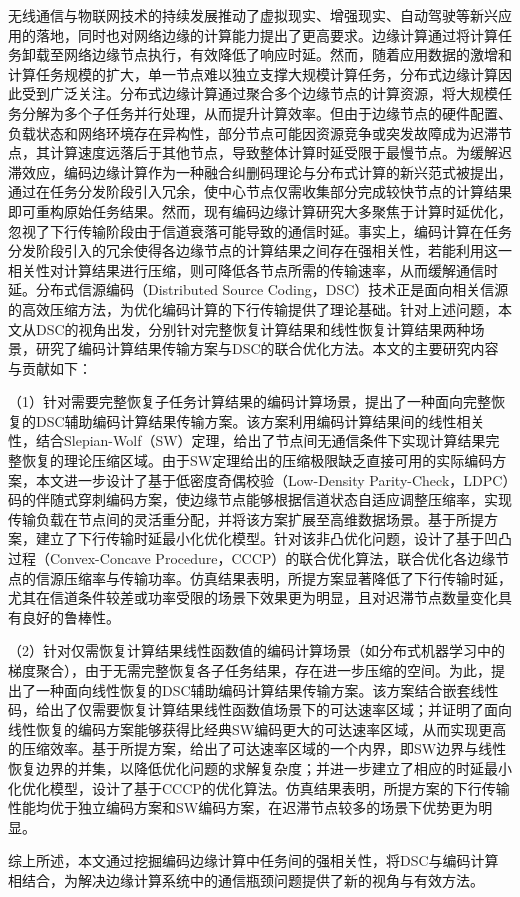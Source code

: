 
无线通信与物联网技术的持续发展推动了虚拟现实、增强现实、自动驾驶等新兴应用的落地，同时也对网络边缘的计算能力提出了更高要求。边缘计算通过将计算任务卸载至网络边缘节点执行，有效降低了响应时延。然而，随着应用数据的激增和计算任务规模的扩大，单一节点难以独立支撑大规模计算任务，分布式边缘计算因此受到广泛关注。分布式边缘计算通过聚合多个边缘节点的计算资源，将大规模任务分解为多个子任务并行处理，从而提升计算效率。但由于边缘节点的硬件配置、负载状态和网络环境存在异构性，部分节点可能因资源竞争或突发故障成为迟滞节点，其计算速度远落后于其他节点，导致整体计算时延受限于最慢节点。为缓解迟滞效应，编码边缘计算作为一种融合纠删码理论与分布式计算的新兴范式被提出，通过在任务分发阶段引入冗余，使中心节点仅需收集部分完成较快节点的计算结果即可重构原始任务结果。然而，现有编码边缘计算研究大多聚焦于计算时延优化，忽视了下行传输阶段由于信道衰落可能导致的通信时延。事实上，编码计算在任务分发阶段引入的冗余使得各边缘节点的计算结果之间存在强相关性，若能利用这一相关性对计算结果进行压缩，则可降低各节点所需的传输速率，从而缓解通信时延。分布式信源编码（Distributed Source Coding，DSC）技术正是面向相关信源的高效压缩方法，为优化编码计算的下行传输提供了理论基础。针对上述问题，本文从DSC的视角出发，分别针对完整恢复计算结果和线性恢复计算结果两种场景，研究了编码计算结果传输方案与DSC的联合优化方法。本文的主要研究内容与贡献如下：

（1）针对需要完整恢复子任务计算结果的编码计算场景，提出了一种面向完整恢复的DSC辅助编码计算结果传输方案。该方案利用编码计算结果间的线性相关性，结合Slepian-Wolf（SW）定理，给出了节点间无通信条件下实现计算结果完整恢复的理论压缩区域。由于SW定理给出的压缩极限缺乏直接可用的实际编码方案，本文进一步设计了基于低密度奇偶校验（Low-Density Parity-Check，LDPC）码的伴随式穿刺编码方案，使边缘节点能够根据信道状态自适应调整压缩率，实现传输负载在节点间的灵活重分配，并将该方案扩展至高维数据场景。基于所提方案，建立了下行传输时延最小化优化模型。针对该非凸优化问题，设计了基于凹凸过程（Convex-Concave Procedure，CCCP）的联合优化算法，联合优化各边缘节点的信源压缩率与传输功率。仿真结果表明，所提方案显著降低了下行传输时延，尤其在信道条件较差或功率受限的场景下效果更为明显，且对迟滞节点数量变化具有良好的鲁棒性。

（2）针对仅需恢复计算结果线性函数值的编码计算场景（如分布式机器学习中的梯度聚合），由于无需完整恢复各子任务结果，存在进一步压缩的空间。为此，提出了一种面向线性恢复的DSC辅助编码计算结果传输方案。该方案结合嵌套线性码，给出了仅需要恢复计算结果线性函数值场景下的可达速率区域；并证明了面向线性恢复的编码方案能够获得比经典SW编码更大的可达速率区域，从而实现更高的压缩效率。基于所提方案，给出了可达速率区域的一个内界，即SW边界与线性恢复边界的并集，以降低优化问题的求解复杂度；并进一步建立了相应的时延最小化优化模型，设计了基于CCCP的优化算法。仿真结果表明，所提方案的下行传输性能均优于独立编码方案和SW编码方案，在迟滞节点较多的场景下优势更为明显。

综上所述，本文通过挖掘编码边缘计算中任务间的强相关性，将DSC与编码计算相结合，为解决边缘计算系统中的通信瓶颈问题提供了新的视角与有效方法。